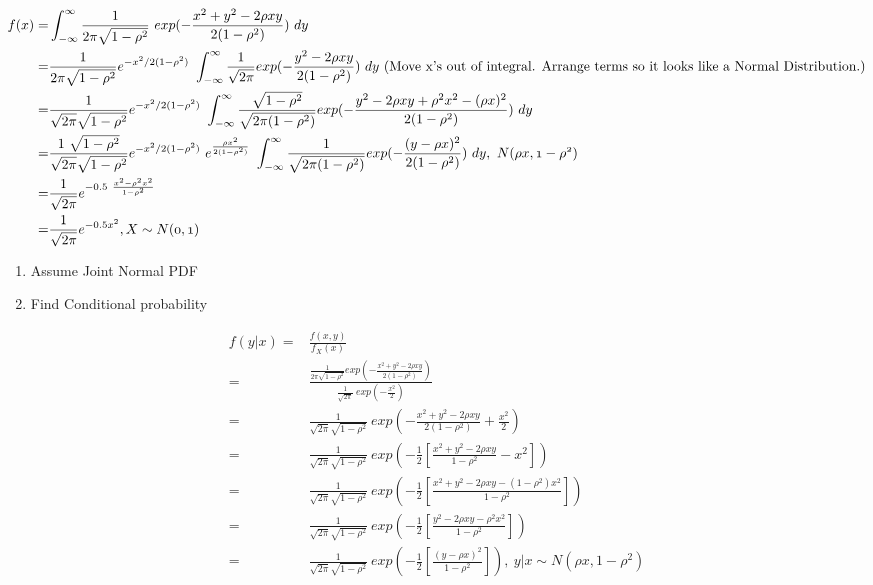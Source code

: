 \documentclass[11pt]{article}
\begin{document}
\begin{equation}
\begin{split}
f(x) = & \int_{- \infty}^{\infty} \frac{1}{2 \pi \sqrt{1 - \rho^2}} \ exp(- \frac{x^2 + y^2 - 2 \rho x y}{2 (1 - \rho^2)}) \ dy\\
= & \frac{1}{2 \pi \sqrt{1 - \rho^2}} e^{-x^2 / 2(1 - \rho^2)} \ \int_{- \infty}^{\infty} \frac{1}{\sqrt{2 \pi}} exp(- \frac{y^2 - 2 \rho x y}{2 (1 - \rho^2)}) \ dy \label{eq:2b1} \ \text{(Move x's out of integral. Arrange terms so it looks like a Normal Distribution.)}\\
= & \frac{1}{\sqrt{2 \pi} \sqrt{1 - \rho^2}} e^{-x^2 / 2(1 - \rho^2)} \ \int_{- \infty}^{\infty} \frac{\sqrt{1 - \rho^2}}{\sqrt{2 \pi (1 - \rho^2)}} exp(- \frac{y^2 - 2 \rho x y + \rho^2 x^2 - (\rho x)^2}{2 (1 - \rho^2)}) \ dy\\
= & \frac{1 \ \sqrt{1 - \rho^2}}{\sqrt{2 \pi} \sqrt{1 - \rho^2}} e^{-x^2 / 2(1 - \rho^2)} \ e^{\frac{\rho x^2}{2 (1 - \rho^2)}} \ \int_{- \infty}^{\infty} \frac{1}{\sqrt{2 \pi (1 - \rho^2)}} exp(- \frac{(y - \rho x)^2}{2 (1 - \rho^2)}) \ dy, \label{eq:2b2} \ \mathnormal{N(\rho x, 1 - \rho^2)}\\
= & \frac{1}{\sqrt{2 \pi}} e^{-0.5 \ \frac{x^2 - \rho^2 x^2}{1 - \rho^2}}\\
= & \frac{1}{\sqrt{2 \pi}} e^{-0.5 x^2}, \label{eq:2b3} \mathnormal{X \sim N(0, 1)}\\
\end{split}
\end{equation}

\begin{enumerate}
\item Assume Joint Normal PDF

\item Find Conditional probability
\end{enumerate}

\begin{equation}
\begin{split}
f(y | x) = & \frac{f(x,y)}{f_X (x)}\\
    = & \frac{\frac{1}{2 \pi \sqrt{1 - \rho^2}} exp(- \frac{x^2 + y^2 - 2 \rho x y}{2 (1 - \rho^2)})}{\frac{1}{\sqrt{2 \pi}} \ exp(- \frac{x^2}{2})}\\
    = & \frac{1}{\sqrt{2 \pi} \sqrt{1 - \rho^2}} \ exp(- \frac{x^2 + y^2 - 2 \rho x y}{2 (1 - \rho^2)} + \frac{x^2}{2})\\
    = & \frac{1}{\sqrt{2 \pi} \sqrt{1 - \rho^2}} \ exp(- \frac{1}{2} [\frac{x^2 + y^2 - 2 \rho x y}{1 - \rho^2} - x^2])\\
    = & \frac{1}{\sqrt{2 \pi} \sqrt{1 - \rho^2}} \ exp(- \frac{1}{2} [\frac{x^2 + y^2 - 2 \rho x y - (1 - \rho^2) x^2}{1 - \rho^2}])\\
    = & \frac{1}{\sqrt{2 \pi} \sqrt{1 - \rho^2}} \ exp(- \frac{1}{2} [\frac{y^2 - 2 \rho x y - \rho^2 x^2}{1 - \rho^2}])\\
    = & \frac{1}{\sqrt{2 \pi} \sqrt{1 - \rho^2}} \ exp(- \frac{1}{2} [\frac{(y - \rho x)^2}{1 - \rho^2}]), \ \label{eq:2bd} y|x \sim N(\rho x, 1 - \rho^2)
\end{split}
\end{equation}
\end{document}
